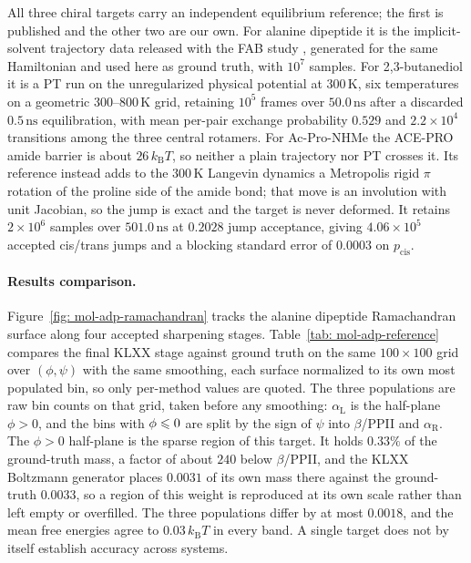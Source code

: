 \documentclass{article}
\begin{document}
All three chiral targets carry an independent equilibrium reference; the first is published and the other two are our own. For alanine dipeptide it is the implicit-solvent trajectory data released with the FAB study \citep{midgley2022flow}, generated for the same Hamiltonian and used here as ground truth, with \(10^7\) samples. For 2,3-butanediol it is a PT run on the unregularized physical potential at \(300\,\mathrm K\), six temperatures on a geometric \(300\)--\(800\,\mathrm K\) grid, retaining \(10^5\) frames over \(50.0\,\mathrm{ns}\) after a discarded \(0.5\,\mathrm{ns}\) equilibration, with mean per-pair exchange probability \(0.529\) and \(2.2\times10^4\) transitions among the three central rotamers. For Ac-Pro-NHMe the ACE-PRO amide barrier is about \(26\,k_{\mathrm B}T\), so neither a plain trajectory nor PT crosses it. Its reference instead adds to the \(300\,\mathrm K\) Langevin dynamics a Metropolis rigid \(\pi\) rotation of the proline side of the amide bond; that move is an involution with unit Jacobian, so the jump is exact and the target is never deformed. It retains \(2\times10^6\) samples over \(501.0\,\mathrm{ns}\) at \(0.2028\) jump acceptance{\color{blue}, giving \(4.06\times10^{5}\) accepted cis/trans jumps and a blocking standard error of \(0.0003\) on \(p_{\mathrm{cis}}\)}.

\paragraph{Results comparison.}
Figure~\ref{fig: mol-adp-ramachandran} tracks the alanine dipeptide Ramachandran surface along four accepted sharpening stages.
Table~\ref{tab: mol-adp-reference} compares the final KLXX stage against ground truth on the same \(100\times100\) grid over \((\phi,\psi)\) with the same smoothing, each surface normalized to its own most populated bin, so only per-method values are quoted. The three populations are raw bin counts on that grid, taken before any smoothing: \(\alpha_{\mathrm L}\) is the half-plane \(\phi>0\), and the bins with \(\phi\leqslant0\) are split by the sign of \(\psi\) into \(\beta\)/PPII and \(\alpha_{\mathrm R}\). The \(\phi>0\) half-plane is the sparse region of this target. It holds \(0.33\%\) of the ground-truth mass, a factor of about \(240\) below \(\beta\)/PPII, and the KLXX Boltzmann generator places \(0.0031\) of its own mass there against the ground-truth \(0.0033\), so a region of this weight is reproduced at its own scale rather than left empty or overfilled. The three populations differ by at most \(0.0018\), and the mean free energies agree to \(0.03\,k_{\mathrm B}T\) in every band. A single target does not by itself establish accuracy across systems.
\end{document}
